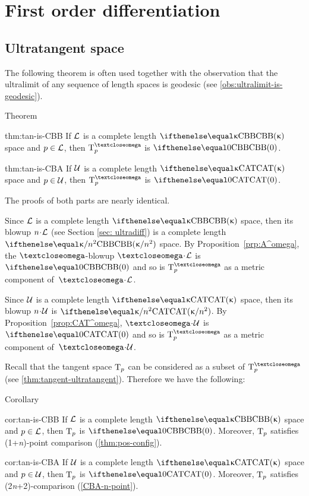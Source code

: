 \chapter{First order differentiation}\label{chap:tan}

\section{Ultratangent space} 

The following theorem is often used together with the 
observation that the ultralimit of any sequence of length spaces is geodesic (see \ref{obs:ultralimit-is-geodesic}).

\begin{thm}{Theorem}\label{thm:tan-is}
\begin{subthm}{thm:tan-is-CBB}
If $\mathcal{L}$ is a complete length  $\Alex{\kappa}$ space and $p\in \spc{L}$, then $\T^\o_p$ is $\Alex{0}$.
\end{subthm}

\begin{subthm}{thm:tan-is-CBA}
If $\mathcal{U}$ is a complete length $\CAT\kappa$ space and $p\in \spc{U}$, then $\T^\o_p$ is $\CAT0$.
\end{subthm}

\end{thm}

The proofs of both parts are nearly identical.

Since $\mathcal{L}$ is a complete length $\Alex{\kappa}$ space, then its blowup $n\cdot\spc{L}$
(see Section \ref{sec: ultradiff})
 is a complete length $\Alex{\kappa/{n^{2}}}$ space.
By Proposition~\ref{prp:A^omega}, the $\o$-blowup $\o\cdot\spc{L}$ is $\Alex0$
and so is $\T_p^\o$ as a metric component of~$\o\cdot\spc{L}$.

Since $\mathcal{U}$ is a complete length $\CAT\kappa$ space, then its blowup $n\cdot\spc{U}$ is $\CAT{\kappa/{n^{2}}}$.
By Proposition~\ref{prop:CAT^omega}, $\o\cdot\spc{U}$ is $\CAT0$
and so is $\T_p^\o$ as a metric component of~$\o\cdot\spc{U}$.
\qeds

Recall that the tangent space $\text{\rm T}_p$ can be considered as a subset of $\T^\o_p$ (see \ref{thm:tangent-ultratangent}).
Therefore we have the following:

\begin{thm}{Corollary}\label{cor:real-tan-is}
\begin{subthm}{cor:tan-is-CBB}
If $\mathcal{L}$ is a complete length $\Alex{\kappa}$ space and $p\in \spc{L}$, then $\text{\rm T}_p$ is $\Alex{0}$.
Moreover, $\text{\rm T}_p$ satisfies (1+\textit{n})-point comparison (\ref{thm:pos-config}).
\end{subthm}

\begin{subthm}{cor:tan-is-CBA}
If $\mathcal{U}$ is a complete length $\CAT\kappa$ space and $p\in \spc{U}$, then $\text{\rm T}_p$ is $\CAT0$.
Moreover, $\text{\rm T}_p$ satisfies (2\textit{n}+2)-comparison (\ref{CBA-n-point}).
\end{subthm}

\end{thm}



